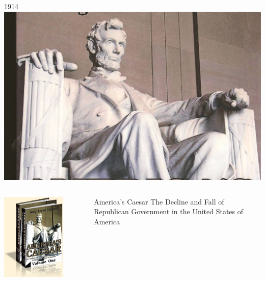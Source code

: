 \begin{frame}{1914}
    \centering
    \includegraphics[width=.9\textwidth]{img/lincoln-memorial.jpg} \\
\end{frame}

\begin{frame}
    \begin{columns}[onlytextwidth]
            \centering
            \includegraphics[width=0.75\textwidth]{img/americas-caesar.png} \\

            \begin{block}{America's Caesar}
                The Decline and Fall of Republican Government in the United States of America
            \end{block}
    \end{columns}
\end{frame}

